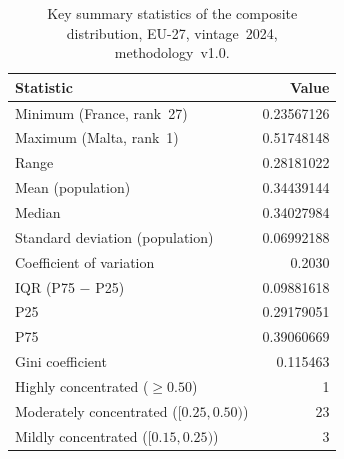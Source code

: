 \begin{table}[htbp]
\centering
\caption{Key summary statistics of the \ISI composite distribution, EU-27, vintage~2024, methodology~v1.0.}
\label{tab:key-summary}
\begin{tabular}{@{}lr@{}}
\toprule
{\textbf{Statistic}} & {\textbf{Value}} \\
\midrule
  Minimum (France, rank~27) & 0.23567126 \\
  Maximum (Malta, rank~1) & 0.51748148 \\
  Range & 0.28181022 \\
  Mean (population) & 0.34439144 \\
  Median & 0.34027984 \\
  Standard deviation (population) & 0.06992188 \\
  Coefficient of variation & 0.2030 \\
  IQR (P75 $-$ P25) & 0.09881618 \\
  P25 & 0.29179051 \\
  P75 & 0.39060669 \\
  Gini coefficient & 0.115463 \\
\addlinespace
  Highly concentrated ($\geq 0.50$) & 1 \\
  Moderately concentrated ($[0.25, 0.50)$) & 23 \\
  Mildly concentrated ($[0.15, 0.25)$) & 3 \\
\bottomrule
\end{tabular}
\end{table}